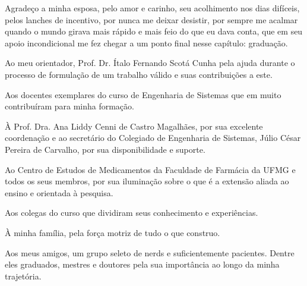 
\begin{agradecimentos}


Agradeço a minha esposa, pelo amor e carinho, seu acolhimento nos dias difíceis, pelos lanches de incentivo, por nunca me deixar desistir, por sempre me acalmar quando o mundo girava mais rápido e mais feio do que eu dava conta, que em seu apoio incondicional me fez chegar a um ponto final nesse capítulo: graduação.

Ao meu orientador, Prof. Dr. Ítalo Fernando Scotá Cunha pela ajuda durante o processo de formulação de um trabalho válido e suas contribuições a este.

Aos docentes exemplares do curso de Engenharia de Sistemas que em muito contribuíram para minha formação.

À Prof. Dra. Ana Liddy Cenni de Castro Magalhães, por sua excelente coordenação e ao secretário do Colegiado de Engenharia de Sistemas, Júlio César Pereira de Carvalho, por sua disponibilidade e suporte.

Ao Centro de Estudos de Medicamentos da Faculdade de Farmácia da UFMG e todos os seus membros, por sua iluminação sobre o que é a extensão aliada ao ensino e orientada à pesquisa.

Aos colegas do curso que dividiram seus conhecimento e experiências.

À minha família, pela força motriz de tudo o que construo.

Aos meus amigos, um grupo seleto de nerds e suficientemente pacientes. Dentre eles graduados, mestres e doutores pela sua importância ao longo da minha trajetória.

\end{agradecimentos}
